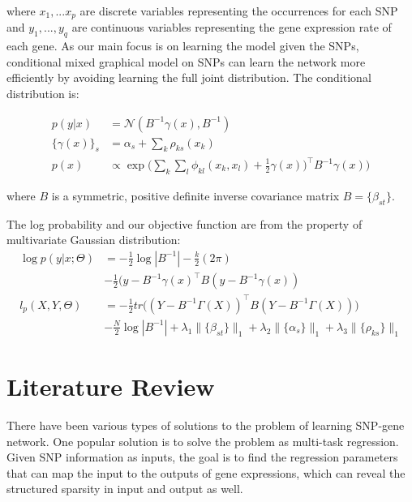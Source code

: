 \documentclass{article}
\begin{document}
where $x_1, ... x_p$ are discrete variables representing the occurrences for each SNP and $y_1, ..., y_q$ are continuous variables representing the gene expression rate of each gene. As our main focus is on learning the model given the SNPs, conditional mixed graphical model on SNPs can learn the network more efficiently by avoiding learning the full joint distribution. The conditional distribution is:

\begin{align}
p(y|x) &= \mathcal{N}(B^{-1}\gamma(x), B^{-1}) \label{eq:cond_prob}\\
\{\gamma(x)\}_s &= \alpha_s + \sum_{k} \rho_{ks}(x_k) \\
p(x) &\propto \exp \Big( \sum_{k} \sum_{l} \phi_{kl}(x_k, x_l) + \frac{1}{2} \gamma(x))^\intercal B^{-1} \gamma(x) \Big)
\end{align}

where $B$ is a symmetric, positive definite inverse covariance matrix $B = \{ \beta_{st}\}$.

The log probability and our objective function are from the property of multivariate Gaussian distribution:
\begin{align}
\log p(y|x; \Theta) &= -\frac{1}{2}\log |B^{-1}| -\frac{k}{2} (2 \pi) \nonumber \\
& -\frac{1}{2} (y - B^{-1} \gamma(x)^\intercal B (y - B^{-1} \gamma(x)) \\
l_p(X, Y, \Theta) &= -\frac{1}{2} tr\Big((Y - B^{-1} \Gamma(X))^\intercal B (Y - B^{-1} \Gamma(X)) \Big) \nonumber \\
& -\frac{N}{2} \log|B^{-1}| + \lambda_1 \|\{\beta_{st}\}\|_1 + \lambda_2 \|\{\alpha_s\}\|_1 + \lambda_3 \|\{\rho_{ks}\}\|_1 \label{eq:obj}
\end{align}

\section{Literature Review}
\label{LiteratureReview}

There have been various types of solutions to the problem of learning SNP-gene network. One popular solution is to solve the problem as multi-task regression.
Given SNP information as inputs, the goal is to find the regression parameters that can map the input to the outputs of gene expressions, which can reveal the structured sparsity in input and output as well.

\end{document}
